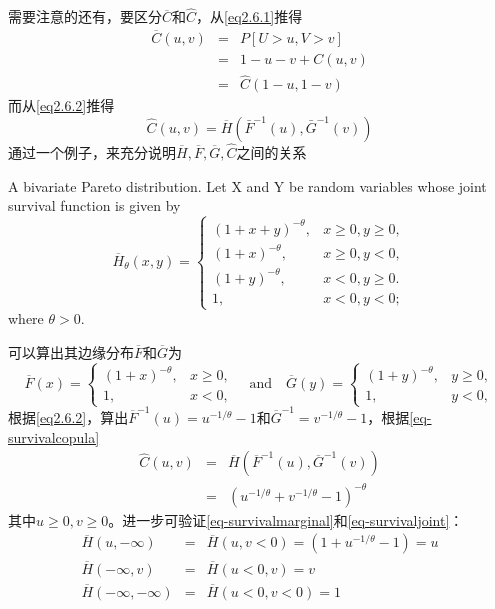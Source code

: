 需要注意的还有，要区分$\overline{C}$和$\hat{C}$，从\cref{eq2.6.1}推得
\begin{eqnarray*}
    \overline{C}(u,v) &=& P[U>u,V>v] \\
    &=& 1-u-v+C(u,v) \\
    &=& \hat{C}(1-u,1-v) 
\end{eqnarray*}
而从\cref{eq2.6.2}推得
\begin{equation}
    \hat{C}(u,v) = \overline{H}(\bar{F}^{-1}(u),\bar{G}^{-1}(v))
    \label{eq-survivalcopula}
\end{equation}
通过一个例子，来充分说明$\overline{H},\overline{F},\overline{G},\hat{C}$之间的关系
\begin{example}
    A bivariate Pareto distribution. Let X and Y be random variables whose joint survival function is given by
    \begin{equation*}
        \overline{H}_{\theta}(x,y) = 
        \begin{cases}
            (1+x+y)^{-\theta}, &x\geq0,y\geq0, \\
            (1+x)^{-\theta}, &x\geq0,y<0, \\
            (1+y)^{-\theta}, &x<0,y \geq 0.\\
            1, &x<0, y<0;
        \end{cases}
    \end{equation*}
    where $\theta >0$. 
    \label{exp2.14}
\end{example}
可以算出其边缘分布$\overline{F}$和$\overline{G}$为
\begin{equation*}
    \overline{F}(x) =
    \begin{cases}
        (1+x)^{-\theta}, &x\geq0, \\
        1, &x<0,
    \end{cases}
    \quad \text{and} \quad \overline{G}(y) = 
    \begin{cases}
        (1+y)^{-\theta}, &y\geq0, \\
        1, & y<0,
    \end{cases}
\end{equation*}
根据\cref{eq2.6.2}，算出$\overline{F}^{-1}(u)= u^{-1/\theta}-1$和$\overline{G}^{-1}=v^{-1/\theta}-1$，根据\cref{eq-survivalcopula}
\begin{eqnarray*}
    \hat{C}(u,v) &=& \overline{H}(\overline{F}^{-1}(u),\overline{G}^{-1}(v)) \\
    &=& (u^{-1/\theta}+v^{-1/\theta}-1)^{-\theta}
\end{eqnarray*}
其中$u\geq 0, v\geq 0$。进一步可验证\cref{eq-survivalmarginal}和\cref{eq-survivaljoint}：
\begin{eqnarray*}
    \overline{H}(u,-\infty) &=& \overline{H}(u,v<0)=(1+u^{-1/\theta}-1) = u \\
    \overline{H}(-\infty,v) &=& \overline{H}(u<0,v) = v \\
    \overline{H}(-\infty,-\infty) &=& \overline{H}(u<0,v<0) = 1
\end{eqnarray*}


